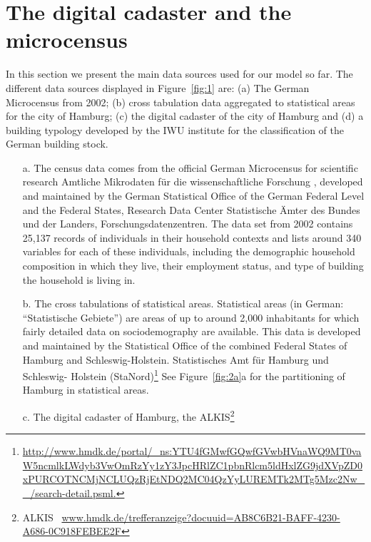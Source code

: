 \documentclass[11pt]{IJM-article}
\begin{document}
\section{The digital cadaster and the microcensus}
\label{sec:3}

In this section we present the main data sources used for our model so far. The
different data sources displayed in Figure~\ref{fig:1} are: (a) The German
Microcensus from 2002; (b) cross tabulation data aggregated to statistical
areas for the city of Hamburg; (c) the digital cadaster of the city of Hamburg
and (d) a building typology developed by the IWU institute for the
classification of the German building stock.\\

\begin{enumerate}\itemsep4ex
    \item[a.] The census data comes from the official German Microcensus for
        scientific research Amtliche Mikrodaten für die wissenschaftliche
        Forschung , developed and maintained by the German
        Statistical Office of the German Federal Level and the Federal States,
        Research Data Center Statistische Ämter des Bundes und der Landers,
        Forschungsdatenzentren.  The data set from 2002 contains 25,137 records
        of individuals in their household contexts and lists around 340
        variables for each of these individuals, including the demographic
        household composition in which they live, their employment status, and
        type of building the household is living in.
    \item[b.] The cross tabulations of statistical areas. Statistical areas (in
        German: ``Statistische Gebiete'') are areas of up to around 2,000
        inhabitants for which fairly detailed data on sociodemography are
        available. This data is developed and maintained by the Statistical
        Office of the combined Federal States of Hamburg and
        Schleswig-Holstein. Statistisches Amt für Hamburg und Schleswig-
        Holstein (StaNord)\footnote{\url{http://www.hmdk.de/portal/_ns:YTU4fGMwfGQwfGVwbHVnaWQ9MT0vaW5ncmlkLWdyb3VwOmRzYy1zY3JpcHRlZC1pbnRlcm5ldHxlZG9jdXVpZD0xPURCOTNCMjNCLUQzRjEtNDQ2MC04QzYyLUREMTk2MTg5Mzc2Nw__/search-detail.psml.}} 
        See Figure~\ref{fig:2a}a for the partitioning of Hamburg in statistical
        areas.
    \item[c.] The digital cadaster of Hamburg, the ALKIS\footnote{ALKIS~\cite{ALKIS}
        \url{www.hmdk.de/trefferanzeige?docuuid=AB8C6B21-BAFF-4230-A686-0C918FEBEE2F}}

\end{enumerate}
\end{document}
